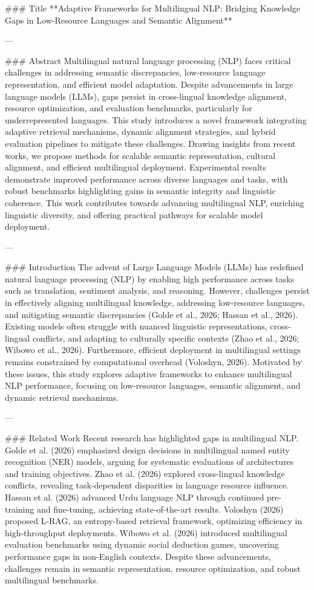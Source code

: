 ### Title  
**Adaptive Frameworks for Multilingual NLP: Bridging Knowledge Gaps in Low-Resource Languages and Semantic Alignment**

---

### Abstract  
Multilingual natural language processing (NLP) faces critical challenges in addressing semantic discrepancies, low-resource language representation, and efficient model adaptation. Despite advancements in large language models (LLMs), gaps persist in cross-lingual knowledge alignment, resource optimization, and evaluation benchmarks, particularly for underrepresented languages. This study introduces a novel framework integrating adaptive retrieval mechanisms, dynamic alignment strategies, and hybrid evaluation pipelines to mitigate these challenges. Drawing insights from recent works, we propose methods for scalable semantic representation, cultural alignment, and efficient multilingual deployment. Experimental results demonstrate improved performance across diverse languages and tasks, with robust benchmarks highlighting gains in semantic integrity and linguistic coherence. This work contributes towards advancing multilingual NLP, enriching linguistic diversity, and offering practical pathways for scalable model deployment.

---

### Introduction  
The advent of Large Language Models (LLMs) has redefined natural language processing (NLP) by enabling high performance across tasks such as translation, sentiment analysis, and reasoning. However, challenges persist in effectively aligning multilingual knowledge, addressing low-resource languages, and mitigating semantic discrepancies (Golde et al., 2026; Hassan et al., 2026). Existing models often struggle with nuanced linguistic representations, cross-lingual conflicts, and adapting to culturally specific contexts (Zhao et al., 2026; Wibowo et al., 2026). Furthermore, efficient deployment in multilingual settings remains constrained by computational overhead (Voloshyn, 2026). Motivated by these issues, this study explores adaptive frameworks to enhance multilingual NLP performance, focusing on low-resource languages, semantic alignment, and dynamic retrieval mechanisms.

---

### Related Work  
Recent research has highlighted gaps in multilingual NLP. Golde et al. (2026) emphasized design decisions in multilingual named entity recognition (NER) models, arguing for systematic evaluations of architectures and training objectives. Zhao et al. (2026) explored cross-lingual knowledge conflicts, revealing task-dependent disparities in language resource influence. Hassan et al. (2026) advanced Urdu language NLP through continued pre-training and fine-tuning, achieving state-of-the-art results. Voloshyn (2026) proposed L-RAG, an entropy-based retrieval framework, optimizing efficiency in high-throughput deployments. Wibowo et al. (2026) introduced multilingual evaluation benchmarks using dynamic social deduction games, uncovering performance gaps in non-English contexts. Despite these advancements, challenges remain in semantic representation, resource optimization, and robust multilingual benchmarks.

